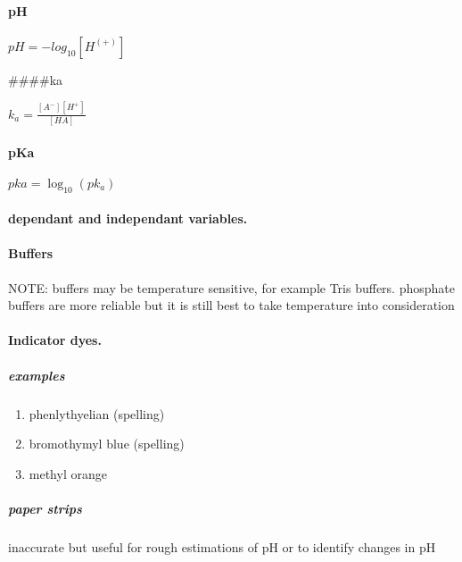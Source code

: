 \documentclass[]{article}
\providecommand{\tightlist}{%
  \setlength{\itemsep}{0pt}\setlength{\parskip}{0pt}}
\let\oldparagraph\paragraph
\renewcommand{\paragraph}[1]{\oldparagraph{#1}\mbox{}}
\let\oldsubparagraph\subparagraph
\renewcommand{\subparagraph}[1]{\oldsubparagraph{#1}\mbox{}}
\begin{document}
\hypertarget{ph}{%
\paragraph{pH}\label{ph}}

\(pH=-log_{10}[H^(+)]\)

\#\#\#\#ka

\(k_{a}=\frac{[A^{-}][H^+]}{[HA]}\)

\hypertarget{pka}{%
\paragraph{pKa}\label{pka}}

\(pka=\log_{10}(pk_a)\)

\hypertarget{dependant-and-independant-variables.}{%
\paragraph{dependant and independant
variables.}\label{dependant-and-independant-variables.}}

\hypertarget{buffers}{%
\paragraph{Buffers}\label{buffers}}

NOTE: buffers may be temperature sensitive, for example Tris buffers.
phosphate buffers are more reliable but it is still best to take
temperature into consideration

\hypertarget{indicator-dyes.}{%
\paragraph{Indicator dyes.}\label{indicator-dyes.}}

\hypertarget{examples-3}{%
\subparagraph{examples}\label{examples-3}}

\begin{enumerate}
\def\labelenumi{\arabic{enumi}.}
\tightlist
\item
  phenlythyelian (spelling)
\item
  bromothymyl blue (spelling)
\item
  methyl orange
\end{enumerate}

\hypertarget{paper-strips}{%
\subparagraph{paper strips}\label{paper-strips}}

inaccurate but useful for rough estimations of pH or to identify changes
in pH
\end{document}
